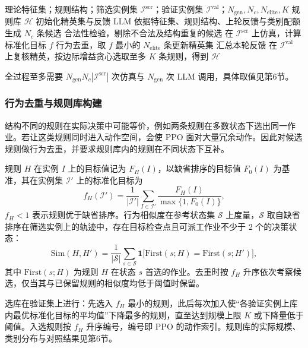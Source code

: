 \documentclass[12pt,a4paper]{article}
\newcommand{\cH}{\mathcal{H}}
\newcommand{\cI}{\mathcal{I}}
\begin{document}
\begin{algorithm}[t]
  \caption{基于 LLM 的迭代规则生成与规则库构造}\label{alg:gen}
  \begin{algorithmic}[1]
    \Require 理论特征集；规则结构；筛选实例集 $\cI^{\mathrm{scr}}$；验证实例集 $\cI^{\mathrm{val}}$；$N_{\mathrm{gen}},N_c,N_{\mathrm{elite}},K$
    \Ensure 规则库 $\cH$
    \State 初始化精英集与反馈
      \State LLM 依据特征集、规则结构、上轮反馈与类别配额生成 $N_c$ 条候选
      \State 合法性检验，剔除不合法及结构重复的候选
      \State 在 $\cI^{\mathrm{scr}}$ 上仿真，计算标准化目标 $f$
      \State 行为去重，取 $f$ 最小的 $N_{\mathrm{elite}}$ 条更新精英集
      \State 汇总本轮反馈
    \EndFor
    \State 在 $\cI^{\mathrm{val}}$ 上复核精英，按边际增益贪心选取至多 $K$ 条规则，得到 $\cH$
  \end{algorithmic}
\end{algorithm}

全过程至多需要 $N_{\mathrm{gen}}N_c|\cI^{\mathrm{scr}}|$ 次仿真与 $N_{\mathrm{gen}}$ 次 LLM 调用，具体取值见第6节。

\subsubsection{行为去重与规则库构建}

结构不同的规则在实际决策中可能等价，例如两条规则在多数状态下选出同一作业。若让这类规则同时进入动作空间，会使 PPO 面对大量冗余动作。因此对候选规则做行为去重，并要求规则库内的规则在不同状态下互补。

规则 $H$ 在实例 $I$ 上的目标值记为 $F_H(I)$，以缺省排序的目标值 $F_{0}(I)$ 为基准，其在实例集 $\cI'$ 上的标准化目标为
\begin{equation}\label{eq:fi}
  f_H(\cI')=\frac{1}{|\cI'|}\sum_{I\in\cI'}\frac{F_H(I)}{\max\{1,F_0(I)\}},
\end{equation}
$f_H<1$ 表示规则优于缺省排序。行为相似度在参考状态集 $\mathcal{S}$ 上度量，$\mathcal{S}$ 取自缺省排序在筛选实例上的轨迹中，存在目标检查点且可派工作业不少于 2 个的决策状态：
\begin{equation}\label{eq:sim}
  \mathrm{Sim}(H,H')=\frac{1}{|\mathcal{S}|}\sum_{s\in\mathcal{S}}\mathbf{1}\bigl[\mathrm{First}(s;H)=\mathrm{First}(s;H')\bigr],
\end{equation}
其中 $\mathrm{First}(s;H)$ 为规则 $H$ 在状态 $s$ 首选的作业。去重时按 $f_H$ 升序依次考察候选，仅当其与已保留规则的相似度均低于阈值时保留。

选库在验证集上进行：先选入 $f_H$ 最小的规则，此后每次加入使``各验证实例上库内最优标准化目标的平均值''下降最多的规则，直至达到规模上限 $K$ 或下降量低于阈值。入选规则按 $f_H$ 升序编号，编号即 PPO 的动作索引。规则库的实际规模、类别分布与对照结果见第6节。
\end{document}
